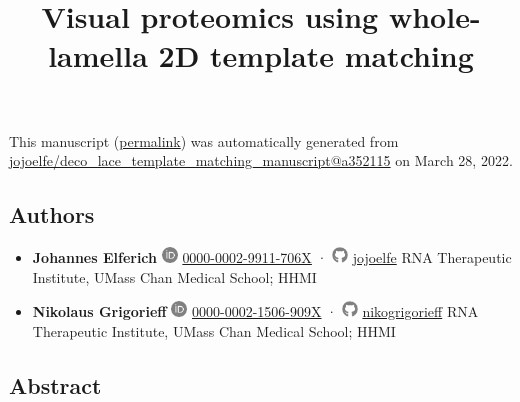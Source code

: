 \documentclass[
]{article}
\title{Visual proteomics using whole-lamella 2D template matching}
\author{}
\date{}
\begin{document}
\maketitle

This manuscript
(\href{https://jojoelfe.github.io/deco_lace_template_matching_manuscript/v/a352115c27ccb3b7fa2977015e71c3c7dbb4f954/}{permalink})
was automatically generated
from \href{https://github.com/jojoelfe/deco_lace_template_matching_manuscript/tree/a352115c27ccb3b7fa2977015e71c3c7dbb4f954}{jojoelfe/deco\_lace\_template\_matching\_manuscript@a352115}
on March 28, 2022.

\hypertarget{authors}{%
\subsection{Authors}\label{authors}}

\begin{itemize}
\item
  \textbf{Johannes Elferich}
  \includegraphics[width=0.16667in,height=0.16667in]{images/orcid.pdf}
  \href{https://orcid.org/0000-0002-9911-706X}{0000-0002-9911-706X}
  · \includegraphics[width=0.16667in,height=0.16667in]{images/github.pdf}
  \href{https://github.com/jojoelfe}{jojoelfe}
  RNA Therapeutic Institute, UMass Chan Medical School; HHMI
\item
  \textbf{Nikolaus Grigorieff}
  \includegraphics[width=0.16667in,height=0.16667in]{images/orcid.pdf}
  \href{https://orcid.org/0000-0002-1506-909X}{0000-0002-1506-909X}
  · \includegraphics[width=0.16667in,height=0.16667in]{images/github.pdf}
  \href{https://github.com/nikogrigorieff}{nikogrigorieff}
  RNA Therapeutic Institute, UMass Chan Medical School; HHMI
\end{itemize}

\hypertarget{abstract}{%
\subsection{Abstract}\label{abstract}}
\end{document}
